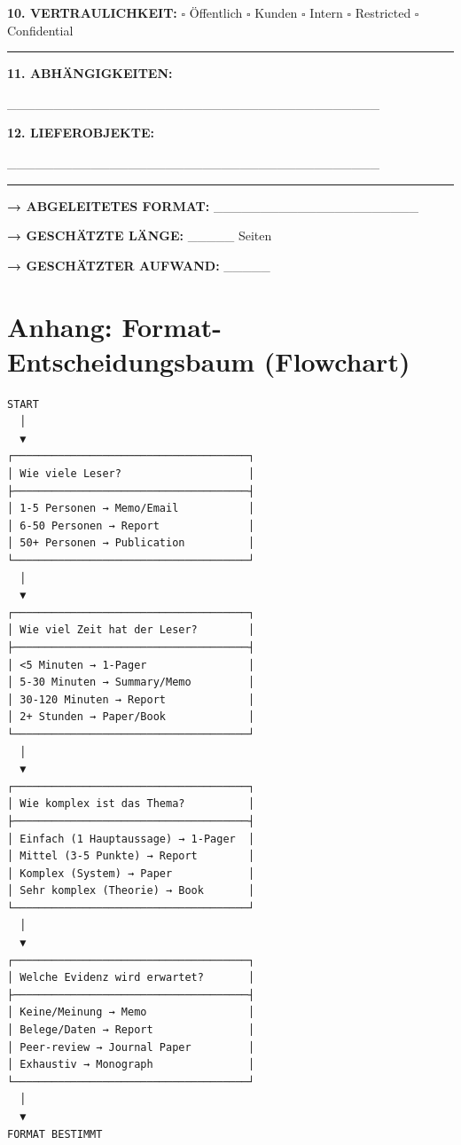 \documentclass[12pt,a4paper]{article}
\begin{document}
\begin{tcolorbox}[colback=gray!10!white, colframe=black, 
    title=DOCUMENT SPECIFICATION CARD (Template)]
\textbf{10. VERTRAULICHKEIT:} $\square$ Öffentlich $\square$ Kunden $\square$ Intern 
$\square$ Restricted $\square$ Confidential

\rule{\textwidth}{0.3pt}

\textbf{11. ABHÄNGIGKEITEN:}

\_\_\_\_\_\_\_\_\_\_\_\_\_\_\_\_\_\_\_\_\_\_\_\_\_\_\_\_\_\_\_\_\_\_\_\_\_\_\_\_

\textbf{12. LIEFEROBJEKTE:}

\_\_\_\_\_\_\_\_\_\_\_\_\_\_\_\_\_\_\_\_\_\_\_\_\_\_\_\_\_\_\_\_\_\_\_\_\_\_\_\_

\rule{\textwidth}{0.3pt}

\textbf{→ ABGELEITETES FORMAT:} \_\_\_\_\_\_\_\_\_\_\_\_\_\_\_\_\_\_\_\_\_\_

\textbf{→ GESCHÄTZTE LÄNGE:} \_\_\_\_\_ Seiten

\textbf{→ GESCHÄTZTER AUFWAND:} \_\_\_\_\_

\end{tcolorbox}


\section{Anhang: Format-Entscheidungsbaum (Flowchart)}

\begin{verbatim}
START
  │
  ▼
┌─────────────────────────────────────┐
│ Wie viele Leser?                    │
├─────────────────────────────────────┤
│ 1-5 Personen → Memo/Email           │
│ 6-50 Personen → Report              │
│ 50+ Personen → Publication          │
└─────────────────────────────────────┘
  │
  ▼
┌─────────────────────────────────────┐
│ Wie viel Zeit hat der Leser?        │
├─────────────────────────────────────┤
│ <5 Minuten → 1-Pager                │
│ 5-30 Minuten → Summary/Memo         │
│ 30-120 Minuten → Report             │
│ 2+ Stunden → Paper/Book             │
└─────────────────────────────────────┘
  │
  ▼
┌─────────────────────────────────────┐
│ Wie komplex ist das Thema?          │
├─────────────────────────────────────┤
│ Einfach (1 Hauptaussage) → 1-Pager  │
│ Mittel (3-5 Punkte) → Report        │
│ Komplex (System) → Paper            │
│ Sehr komplex (Theorie) → Book       │
└─────────────────────────────────────┘
  │
  ▼
┌─────────────────────────────────────┐
│ Welche Evidenz wird erwartet?       │
├─────────────────────────────────────┤
│ Keine/Meinung → Memo                │
│ Belege/Daten → Report               │
│ Peer-review → Journal Paper         │
│ Exhaustiv → Monograph               │
└─────────────────────────────────────┘
  │
  ▼
FORMAT BESTIMMT
\end{verbatim}
\end{document}
